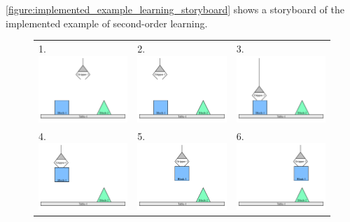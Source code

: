 {\mbox{\autoref{figure:implemented_example_learning_storyboard}}}
shows a storyboard of the implemented example of second-order
learning.
\begin{figure}
\begin{center}
\begin{tabular}{p{4cm}p{4cm}p{4cm}}
1. \includegraphics[width=4cm]{gfx/blocks_world_example-1}  & 2. \includegraphics[width=4cm]{gfx/blocks_world_example-2}  & 3. \includegraphics[width=4cm]{gfx/blocks_world_example-3} \\
4. \includegraphics[width=4cm]{gfx/blocks_world_example-4}  & 5. \includegraphics[width=4cm]{gfx/blocks_world_example-5}  & 6. \includegraphics[width=4cm]{gfx/blocks_world_example-6} \\

\end{tabular}
\end{center}
\end{figure}

